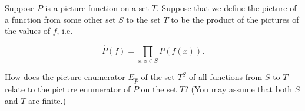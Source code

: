 \iteme   Suppose $P$ is a picture function on a set $T$.  Suppose that we define
the picture of a function from some other set $S$ to the set $T$ to be the
product
of the pictures of the values of $f$, i.e.

$$\hat P(f) = \prod_{x:x\in S}P(f(x)).$$

How does the picture enumerator $E_{\hat P}$ of the set $T^S$ of all functions
from
$S$ to $T$ relate to the picture enumerator of $P$ on the set $T$?  (You may assume
that both
$S$ and
$T$ are finite.)\label{PictureEnumeratorforFunctions}

